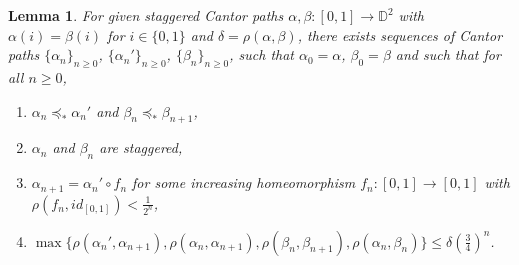 \documentclass[12pt, leqno]{amsart}
\newcommand{\ord}{\preceq_{\ast}}
\newcommand{\ui}{[0,1]}
\newcommand{\bbd}{\mathbb{D}}
\newtheorem{lemma}[theorem]{Lemma}
\theoremstyle{definition}\newtheorem{definition}[theorem]{Definition}
\begin{document}
\begin{lemma}\label{recursionlemma}
For given staggered Cantor paths $\alpha,\beta:\ui\to\bbd^2$ with $\alpha(i)=\beta(i)$ for $i\in\{0,1\}$ and $\delta=\rho(\alpha,\beta)$, there exists sequences of Cantor paths $\{\alpha_n\}_{n\geq 0}$, $\{\alpha_{n}'\}_{n\geq 0}$, $\{\beta_n\}_{n\geq 0}$, such that $\alpha_0=\alpha$, $\beta_0=\beta$ and such that for all $n\geq 0$,
\begin{enumerate}
\item $\alpha_{n}\ord \alpha_{n}'$ and $\beta_{n}\ord \beta_{n+1}$,
\item $\alpha_n$ and $\beta_n$ are staggered,
\item $\alpha_{n+1}=\alpha_{n}'\circ f_n$ for some increasing homeomorphism $f_n:\ui\to\ui$ with $\rho(f_n,id_{\ui})<\frac{1}{2^n}$,
\item $\max\{\rho(\alpha_{n}',\alpha_{n+1}),\rho(\alpha_n,\alpha_{n+1}),\rho(\beta_n,\beta_{n+1}),\rho(\alpha_n,\beta_{n})\}\leq \delta\left(\frac{3}{4}\right)^n$.
\end{enumerate}
\end{lemma}
\end{document}
